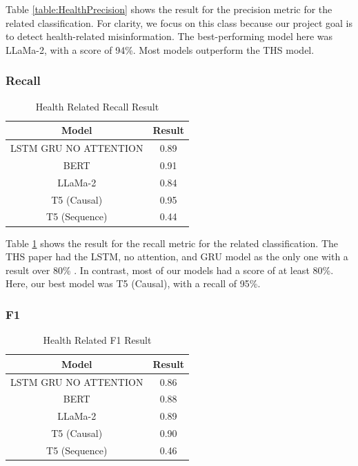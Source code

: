 Table \ref{table:HealthPrecision} shows the result for the precision metric for the related classification. For clarity, we focus on this class because our project
goal is to detect health-related misinformation. The best-performing model here was LLaMa-2, with a score of 94\%. Most models outperform the THS model.

\subsubsection{Recall}
\begin{table}[htb]
	\centering
	\caption{Health Related Recall Result}
	{
	\begin{tabular}{||c | c||} 
		\hline
		\textbf{Model} & \textbf{Result} \\
		\hline
		LSTM GRU NO ATTENTION & 0.89  \\
		\hline
		BERT & 0.91  \\
		\hline
		LLaMa-2 & 0.84 \\ 
		\hline
		T5 (Causal) & 0.95 \\
		\hline
		T5 (Sequence) & 0.44 \\
		\hline
	\end{tabular}
	}
	\label{table:HealthRecall}
\end{table}

Table \ref{table:HealthRecall} shows the result for the recall metric for the related classification. The THS paper had  the LSTM, no attention, and
GRU model as the only one with a result over 80\% \cite{8622504}. In contrast, most of our models had a score of at least 80\%. Here, our best model was T5
(Causal), with a recall of 95\%.

\subsubsection{F1}
\begin{table}[!htb]
	\centering
	\caption{Health Related F1 Result}
	{
	\begin{tabular}{||c | c||} 
		\hline
		\textbf{Model} & \textbf{Result} \\
		\hline
		LSTM GRU NO ATTENTION & 0.86  \\
		\hline
		BERT & 0.88  \\
		\hline
		LLaMa-2 & 0.89 \\ 
		\hline
		T5 (Causal) & 0.90 \\
		\hline
		T5 (Sequence) & 0.46 \\
		\hline
	\end{tabular}
	}
	\label{table:HealthF1}
\end{table}

